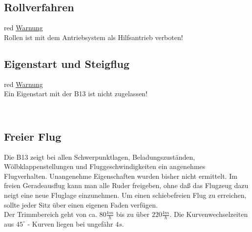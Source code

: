 \subsection{Rollverfahren}
\begin{color}{red}
\large{\underline{Warnung}}\\
Rollen ist mit dem Antriebsystem als Hilfsantrieb verboten!
\end{color}

\subsection{Eigenstart und Steigflug}
\begin{color}{red}
\large{\underline{Warnung}}\\
Ein Eigenstart mit der B13 ist nicht zugelassen!
\end{color}\\
\newline

\subsection{Freier Flug}
Die B13 zeigt bei allen Schwerpunktlagen, Beladungszuständen, Wölbklappenstellungen und Fluggeschwindigkeiten ein angenehmes Flugverhalten. Unangenehme Eigenschaften wurden bisher nicht ermittelt. Im freien Geradeausflug kann man alle Ruder freigeben, ohne daß das Flugzeug dazu neigt eine neue Fluglage einzunehmen. Um einen schiebefreien Flug zu erreichen, sollte jeder Sitz über einen eigenen Faden verfügen.\\
\newline
Der Trimmbereich geht von ca. $80 \frac{km}{h}$ bis zu über $220 \frac{km}{h}$. Die Kurvenwechselzeiten aus $45^{\circ}$ - Kurven liegen bei ungefähr $4s$.\\

